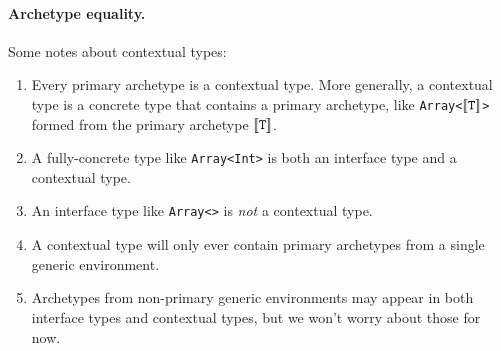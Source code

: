 \documentclass[../generics]{subfiles}
\begin{document}
\paragraph{Archetype equality.} Some notes about contextual types:
\begin{enumerate}
\item Every primary archetype is a contextual type. More generally, a contextual type is a concrete type that contains a primary archetype, like \texttt{Array<$[\![\texttt{T}]\!]$>} formed from the primary archetype $[\![\texttt{T}]\!]$.
\item A fully-concrete type like \texttt{Array<Int>} is both an interface type and a contextual type.
\item An interface type like \texttt{Array<\rT>} is \emph{not} a contextual type.
\item A contextual type will only ever contain primary archetypes from a single generic environment.
\item Archetypes from non-primary generic environments may appear in both interface types and contextual types, but we won't worry about those for now.
\end{enumerate}
\end{document}
